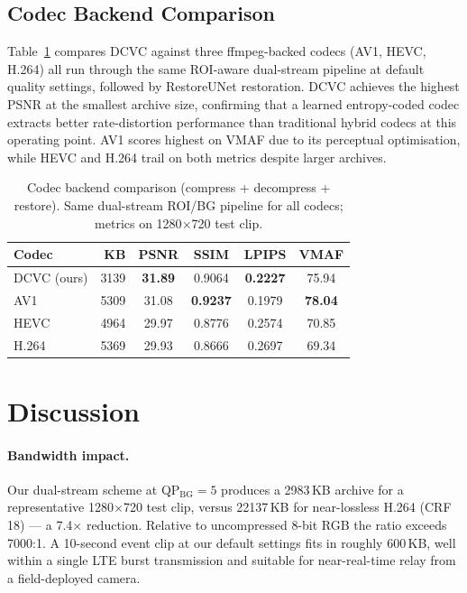 \documentclass[10pt, conference]{IEEEtran}
\begin{document}
\subsection{Codec Backend Comparison}

Table~\ref{tab:codec_comparison} compares DCVC against three ffmpeg-backed codecs (AV1, HEVC, H.264) all run through the same ROI-aware dual-stream pipeline at default quality settings, followed by RestoreUNet restoration. DCVC achieves the highest PSNR at the smallest archive size, confirming that a learned entropy-coded codec extracts better rate-distortion performance than traditional hybrid codecs at this operating point. AV1 scores highest on VMAF due to its perceptual optimisation, while HEVC and H.264 trail on both metrics despite larger archives.

\begin{table}[t]
\centering
\caption{Codec backend comparison (compress + decompress + restore). Same dual-stream ROI/BG pipeline for all codecs; metrics on 1280$\times$720 test clip.}
\label{tab:codec_comparison}
\setlength{\tabcolsep}{4pt}
\begin{tabular}{lrcccc}
\toprule
Codec & KB & PSNR & SSIM & LPIPS & VMAF \\
\midrule
DCVC (ours) & 3139 & \textbf{31.89} & 0.9064 & \textbf{0.2227} & 75.94 \\
AV1         & 5309 & 31.08 & \textbf{0.9237} & 0.1979 & \textbf{78.04} \\
HEVC        & 4964 & 29.97 & 0.8776 & 0.2574 & 70.85 \\
H.264       & 5369 & 29.93 & 0.8666 & 0.2697 & 69.34 \\
\bottomrule
\end{tabular}
\end{table}

\section{Discussion}

\paragraph{Bandwidth impact.}
Our dual-stream scheme at QP$_\text{BG}{=}5$ produces a 2983\,KB archive for a representative 1280$\times$720 test clip, versus 22137\,KB for near-lossless H.264 (CRF 18) --- a 7.4$\times$ reduction. Relative to uncompressed 8-bit RGB the ratio exceeds 7000:1. A 10-second event clip at our default settings fits in roughly 600\,KB, well within a single LTE burst transmission and suitable for near-real-time relay from a field-deployed camera.
\end{document}

